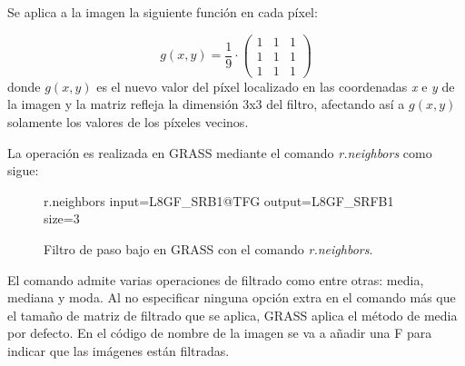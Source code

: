 Se aplica a la imagen la siguiente función en cada píxel:

\begin{equation}
	g(x,y)=\frac{1}{9} \cdot \left(\begin{array}{ccc}
								   	1&1&1\\
								   	1&1&1\\
							 	   	1&1&1
								   \end{array}
							 \right)
\end{equation}
donde $g(x,y)$ es el nuevo valor del píxel localizado en las coordenadas \textit{x} e \textit{y} de la imagen y la matriz refleja la dimensión 3x3 del filtro, afectando así a $g(x,y)$ solamente los valores de los píxeles vecinos.\Sep

La operación es realizada en GRASS mediante el comando \textit{r.neighbors} como sigue:

\begin{figure}[h]
\centering
\begin{boxedverbatim}
	r.neighbors input=L8GF_SRB1@TFG output=L8GF_SRFB1 size=3
\end{boxedverbatim}
\caption[Filtro de paso bajo]{Filtro de paso bajo en GRASS con el comando \textit{r.neighbors}.}
\end{figure}

El comando admite varias operaciones de filtrado como entre otras: media, mediana y moda. Al no especificar ninguna opción extra en el comando más que el tamaño de matriz de filtrado que se aplica, GRASS aplica el método de media por defecto. En el código de nombre de la imagen se va a añadir una F para indicar que las imágenes están filtradas.
